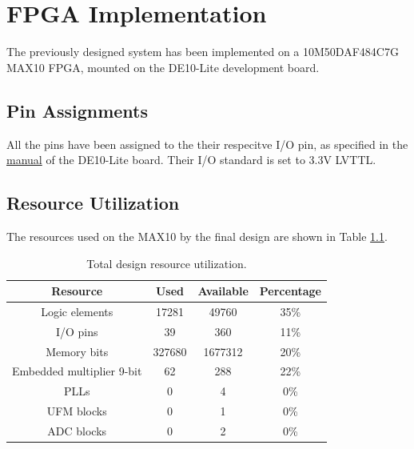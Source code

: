 \documentclass[11pt]{report}
\begin{document}
\chapter{FPGA Implementation}
The previously designed system has been implemented on a 10M50DAF484C7G MAX10 FPGA, mounted on the DE10-Lite development board.
\section{Pin Assignments}
All the pins have been assigned to the their respecitve I/O pin, as specified in the \href{https://ftp.intel.com/Public/Pub/fpgaup/pub/Intel_Material/Boards/DE10-Lite/DE10_Lite_User_Manual.pdf}{manual} of the DE10-Lite board. Their I/O standard is set to 3.3V LVTTL.

\section{Resource Utilization}

The resources used on the MAX10 by the final design are shown in Table \ref{tab:res_utilization}.

\begin{table}[!h]
\renewcommand{\arraystretch}{1.5}
\centering
\begin{tabular}{|c|c|c|c|}
\hline
\textbf{Resource}         & \textbf{Used} & \textbf{Available} & \textbf{Percentage} \\ \hline
Logic elements            & 17281         & 49760              & 35\%                \\ \hline
I/O pins                  & 39            & 360                & 11\%                \\ \hline
Memory bits               & 327680        & 1677312            & 20\%                \\ \hline
Embedded multiplier 9-bit & 62            & 288                & 22\%                \\ \hline
PLLs                      & 0             & 4                  & 0\%                 \\ \hline
UFM blocks                & 0             & 1                  & 0\%                 \\ \hline
ADC blocks                & 0             & 2                  & 0\%                 \\ \hline
\end{tabular}
\caption{Total design resource utilization.}
\label{tab:res_utilization}
\end{table}
\end{document}
